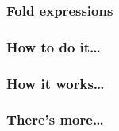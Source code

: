 

\subsubsection{Fold expressions}

\subsubsection{How to do it…}


\subsubsection{How it works…}


\subsubsection{There's more…}
